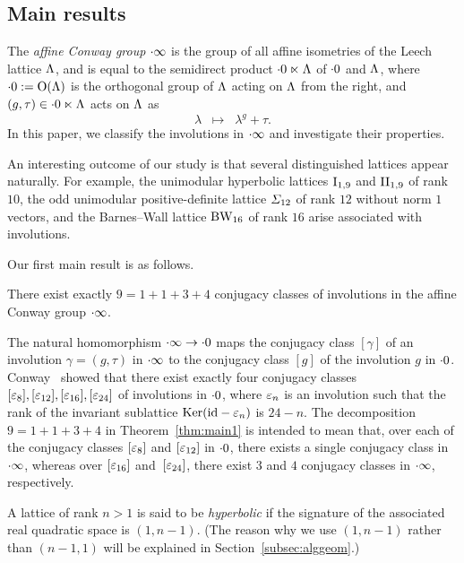 \documentclass{amsart} %
\begin{document}
\subsection{Main results}
%
The \emph{affine Conway group} $\cdot \infty$ is the group of 
all affine isometries of the Leech lattice $\Lambda$,
and is equal to the semidirect product $\cdot 0 \ltimes \Lambda$
of $\cdot 0$ and $\Lambda$,
where $\cdot 0:=\mathord{\mathrm{O}}(\Lambda)$ is the orthogonal group of $\Lambda$
acting on $\Lambda$ from the right, and 
$(g, \tau)\in \cdot 0 \ltimes \Lambda$ acts on $\Lambda$ as
\[
\lambda\;\;\mapsto\;\; \lambda^g+\tau.
\]
In this paper,
we classify the involutions in $\cdot \infty$ and investigate their properties. 
\par
An interesting outcome of our study is that 
several distinguished lattices appear naturally. 
For example, the unimodular hyperbolic lattices $\mathrm{I}_{1, 9}$ and $\mathrm{II}_{1, 9}$ of rank $10$, 
the odd unimodular positive-definite lattice $\varSigma_{12}$ 
of rank $12$ without norm $1$ vectors, 
and the Barnes--Wall lattice $\mathrm{BW}_{16}$ of rank $16$ 
arise associated with involutions.
\par
Our first main result is as follows.
%
\begin{theorem}\label{thm:main1}
There exist exactly 
$9=1+1+3+4$
conjugacy classes of involutions in the affine Conway group $\cdot \infty$.
\end{theorem}
%
The natural homomorphism $\cdot \infty \to \cdot 0$ maps
the conjugacy class $[\gamma]$ of an involution $\gamma=(g, \tau)$
in $\cdot \infty$ to the conjugacy class $[g]$ of the involution $g$ in $\cdot 0$. 
Conway~\cite[Chapter 10,~Section 3.7]{theCSbook}
showed that there exist exactly four conjugacy classes
$[\varepsilon_8], [\varepsilon_{12}], [\varepsilon_{16}], [\varepsilon_{24}]$ of involutions in $\cdot 0$,
where $\varepsilon_n$ is an involution such that the rank of 
the invariant sublattice 
$\operatorname{Ker}(\mathord{\mathrm{id}}-\varepsilon_n)$ is $24-n$.
The decomposition $9=1+1+3+4$ in Theorem~\ref{thm:main1} 
is intended to mean that, over each of the conjugacy classes $[\varepsilon_8]$ and $ [\varepsilon_{12}]$ in $\cdot 0$,
there exists a single conjugacy class in $\cdot \infty$,
whereas over %
$[\varepsilon_{16}]$ and~$ [\varepsilon_{24}]$, %
there exist $3$ and $4$ conjugacy classes
in $\cdot \infty$, respectively.
\par
%
A lattice of rank $n>1$ is said to be \emph{hyperbolic}
if the signature of the associated real quadratic space is $(1, n-1)$.
(The reason why we use $(1, n-1)$ rather than $(n-1, 1)$ 
will be explained in Section~\ref{subsec:alggeom}.)
\end{document}
